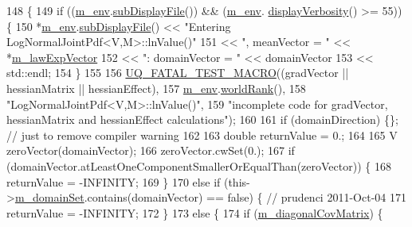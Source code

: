 \begin{DoxyCode}
148 \{
149   \textcolor{keywordflow}{if} ((\hyperlink{class_q_u_e_s_o_1_1_base_scalar_function_adf44141aeb765d97613286f88f235f04}{m\_env}.\hyperlink{class_q_u_e_s_o_1_1_base_environment_a8a0064746ae8dddfece4229b9ad374d6}{subDisplayFile}()) && (\hyperlink{class_q_u_e_s_o_1_1_base_scalar_function_adf44141aeb765d97613286f88f235f04}{m\_env}.
      \hyperlink{class_q_u_e_s_o_1_1_base_environment_a1fe5f244fc0316a0ab3e37463f108b96}{displayVerbosity}() >= 55)) \{
150     *\hyperlink{class_q_u_e_s_o_1_1_base_scalar_function_adf44141aeb765d97613286f88f235f04}{m\_env}.\hyperlink{class_q_u_e_s_o_1_1_base_environment_a8a0064746ae8dddfece4229b9ad374d6}{subDisplayFile}() << \textcolor{stringliteral}{"Entering LogNormalJointPdf<V,M>::lnValue()"}
151                             << \textcolor{stringliteral}{", meanVector = "}   << *\hyperlink{class_q_u_e_s_o_1_1_log_normal_joint_pdf_a1373e1737c3198b852fab05c77abea35}{m\_lawExpVector}
152                             << \textcolor{stringliteral}{": domainVector = "} << domainVector
153                             << std::endl;
154   \}
155 
156   \hyperlink{_defines_8h_a56d63d18d0a6d45757de47fcc06f574d}{UQ\_FATAL\_TEST\_MACRO}((gradVector || hessianMatrix || hessianEffect),
157                       \hyperlink{class_q_u_e_s_o_1_1_base_scalar_function_adf44141aeb765d97613286f88f235f04}{m\_env}.\hyperlink{class_q_u_e_s_o_1_1_base_environment_a78b57112bbd0e6dd0e8afec00b40ffa7}{worldRank}(),
158                       \textcolor{stringliteral}{"LogNormalJointPdf<V,M>::lnValue()"},
159                       \textcolor{stringliteral}{"incomplete code for gradVector, hessianMatrix and hessianEffect calculations"});
160 
161   \textcolor{keywordflow}{if} (domainDirection) \{\}; \textcolor{comment}{// just to remove compiler warning}
162 
163   \textcolor{keywordtype}{double} returnValue = 0.;
164 
165   V zeroVector(domainVector);
166   zeroVector.cwSet(0.);
167   \textcolor{keywordflow}{if} (domainVector.atLeastOneComponentSmallerOrEqualThan(zeroVector)) \{
168     returnValue = -INFINITY;
169   \}
170   \textcolor{keywordflow}{else} \textcolor{keywordflow}{if} (this->\hyperlink{class_q_u_e_s_o_1_1_base_scalar_function_a67696e86211197938c72cd11863f5cf8}{m\_domainSet}.contains(domainVector) == \textcolor{keyword}{false}) \{ \textcolor{comment}{// prudenci 2011-Oct-04}
171     returnValue = -INFINITY;
172   \}
173   \textcolor{keywordflow}{else} \{
174     \textcolor{keywordflow}{if} (\hyperlink{class_q_u_e_s_o_1_1_log_normal_joint_pdf_a8c85380b9a7c7ab746b2c8cc9c9cf5ee}{m\_diagonalCovMatrix}) \{

\end{DoxyCode}
